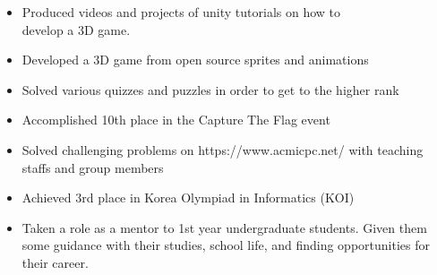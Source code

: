 \documentclass[10pt,a4paper,ragged2e]{altacv}
\begin{document}
\divider


\begin{itemize}

\item Produced videos and projects of unity tutorials on how to \\
develop a 3D game.
\item Developed a 3D game from open source sprites and animations

\end{itemize}

\divider


\begin{itemize}

\item Solved various quizzes and puzzles in order to get to the higher rank
\item Accomplished 10th place in the Capture The Flag event

\end{itemize}

\divider


\begin{itemize}

\item Solved challenging problems on https://www.acmicpc.net/ with teaching staffs and group members
\item Achieved 3rd place in Korea Olympiad in Informatics (KOI)

\end{itemize}



\begin{itemize}

\item Taken a role as a mentor to 1st year undergraduate students.
Given them some guidance with their studies, school life, and finding opportunities for their career. 

\end{itemize}
\end{document}
